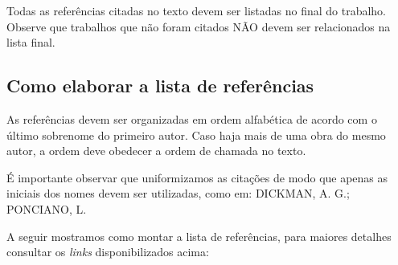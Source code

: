 \documentclass[a4paper,12pt]{article}
\begin{document}
Todas as referências citadas no texto devem ser listadas no final do trabalho. Observe que trabalhos que não foram citados NÃO devem ser relacionados na lista final.

\subsection{Como elaborar a lista de referências}

As referências devem ser organizadas em ordem alfabética de acordo com o último sobrenome do primeiro autor. Caso haja mais de uma obra do mesmo autor, a ordem deve obedecer a ordem de chamada no texto.

É importante observar que uniformizamos as citações de modo que apenas as iniciais dos nomes devem ser utilizadas, como em: DICKMAN, A. G.; PONCIANO, L. 

A seguir mostramos como montar a lista de referências, para maiores detalhes consultar os {\it links} disponibilizados acima:
\end{document}
